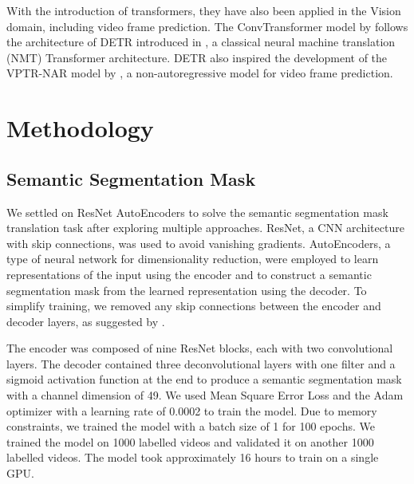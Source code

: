 \documentclass{article}
\begin{document}
With the introduction of transformers, they have also been applied in the Vision domain, 
including video frame prediction. The ConvTransformer model by \citet{Liu2020ConvTransformerAC} 
follows the architecture of DETR introduced in \citet{Meinhardt2021TrackFormerMT}, a classical 
neural machine translation (NMT) Transformer architecture. DETR also inspired the development 
of the VPTR-NAR model by \citet{Ye2022VPTRET}, a non-autoregressive model for video frame 
prediction.

\section{Methodology}
\subsection{Semantic Segmentation Mask}
We settled on ResNet AutoEncoders to solve the semantic segmentation mask translation task after 
exploring multiple approaches. ResNet, a CNN architecture with skip connections, was used to 
avoid vanishing gradients. AutoEncoders, a type of neural network for dimensionality reduction,
were employed to learn representations of the input using the encoder and to construct a 
semantic segmentation mask from the learned representation using the decoder. To simplify 
training, we removed any skip connections between the encoder and decoder layers, as suggested 
by \citet{Ye2022VPTRET}.

The encoder was composed of nine ResNet blocks, each with two convolutional layers. The decoder 
contained three deconvolutional layers with one filter and a sigmoid activation function at the 
end to produce a semantic segmentation mask with a channel dimension of 49. We used Mean Square 
Error Loss and the Adam optimizer with a learning rate of 0.0002 to train the model. Due to 
memory constraints, we trained the model with a batch size of 1 for 100 epochs. We trained the 
model on 1000 labelled videos and validated it on another 1000 labelled videos. The model took 
approximately 16 hours to train on a single GPU.
\end{document}
